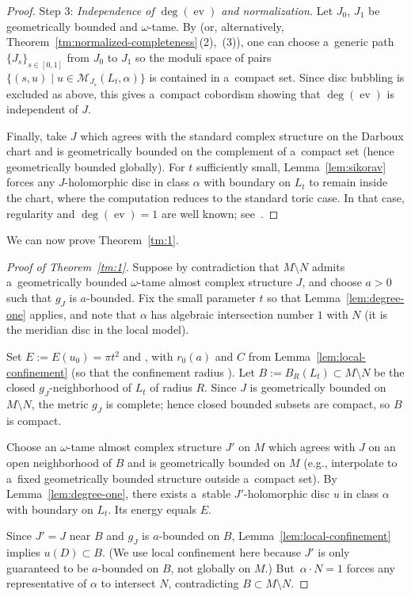 \documentclass[10pt,a4paper]{amsart}
\numberwithin{equation}{section}
\newcommand{\ev}{\operatorname{ev}}
\theoremstyle{definition}
\begin{document}
\begin{proof}
Step 3: \emph{Independence of $\deg(\ev)$ and normalization.}
Let $J_0$, $J_1$ be geometrically bounded and $\omega$-tame.
By \cite[Theorem 4.15\,(a)]{GromanFloerOpen} (or, alternatively, Theorem~\ref{tm:normalized-completeness}\,(2),~(3)), one can choose a~generic path $\{J_s\}_{s\in[0,1]}$ from $J_0$ to $J_1$ so the moduli space of pairs $\{(s,u)\mid u\in \mathcal{M}_{J_s}(L_t,\alpha)\}$ is contained in a~compact set. Since disc bubbling is excluded as above, this gives a~compact cobordism showing that $\deg(\ev)$ is independent of $J$.

Finally, take $J$ which agrees with the standard complex structure on the Darboux chart and is geometrically bounded on the complement of a~compact set (hence geometrically bounded globally). For $t$ sufficiently small, Lemma~\ref{lem:sikorav} forces any $J$-holomorphic disc in class $\alpha$ with boundary on $L_t$ to remain inside the chart, where the computation reduces to the standard toric case. In that case, regularity and $\deg(\ev)=1$ are well known; see~\cite{ChoOhToric,FOOO_Toric1}.
\end{proof}

We can now prove Theorem~\ref{tm:1}.
\begin{proof}[Proof of Theorem~\ref{tm:1}]
Suppose by contradiction that $M\setminus N$ admits a~geometrically bounded $\omega$-tame almost complex structure $J$, and choose $a>0$ such that $g_J$ is $a$-bounded.
Fix the small parameter $t$ so that Lemma~\ref{lem:degree-one} applies, and note that $\alpha$ has algebraic intersection number $1$ with $N$ (it is the meridian disc in the local model).

Set $E:=E(u_0)=\pi t^2$ and , with $r_0(a)$ and $C$ from Lemma~\ref{lem:local-confinement} (so that the confinement radius ).
Let $B:=B_{R}(L_t)\subset M\setminus N$ be the closed $g_J$-neighborhood of $L_t$ of radius $R$.
Since $J$ is geometrically bounded on $M\setminus N$, the metric $g_J$ is complete; hence closed bounded subsets are compact, so $B$ is compact.

Choose an $\omega$-tame almost complex structure $J'$ on $M$ which agrees with $J$ on an open neighborhood of $B$ and is geometrically bounded on $M$ (e.g., interpolate to a~fixed geometrically bounded structure outside a~compact set).
By Lemma~\ref{lem:degree-one}, there exists a~stable $J'$-holomorphic disc $u$ in class $\alpha$ with boundary on $L_t$.
Its energy equals $E$.

Since $J'=J$ near $B$ and $g_J$ is $a$-bounded on $B$, Lemma~\ref{lem:local-confinement} implies $u(D)\subset B$. (We use local confinement here because $J'$ is only guaranteed to be $a$-bounded on $B$, not globally on $M$.)
But~${\alpha\cdot N=1}$ forces any representative of $\alpha$ to intersect $N$, contradicting $B\subset M\setminus N$.
\end{proof}
\end{document}
